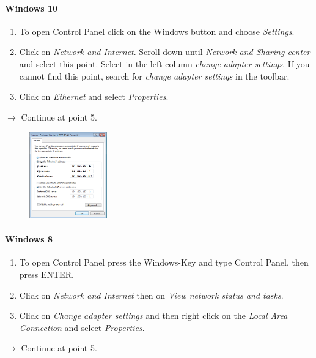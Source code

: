 \documentclass[a4paper,12pt]{scrartcl}
\begin{document}
\paragraph*{Windows 10}
\begin{enumerate}
    \item To open Control Panel click on the Windows button and choose \emph{Settings}.
    \item Click on \emph{Network and Internet}. Scroll down until \emph{Network and Sharing center} and select this point. Select in the left column \textit{change adapter settings}. If you cannot find this point, search for \emph{change adapter settings} in the toolbar.
    \item Click on \emph{Ethernet} and select \emph{Properties}.
\end{enumerate}
$\rightarrow$ Continue at point 5.

\begin{figure}
\centering
  \includegraphics[width=0.3\textwidth]{Bilder/IP_Windows_EN}
\end{figure}

\paragraph*{Windows 8}
\begin{enumerate}	
	\item To open Control Panel press the Windows-Key and type Control Panel, then press ENTER.
    \item Click on \emph{Network and Internet} then on \emph{View network status and tasks}.
	\item Click on \emph{Change adapter settings} and then right click on the \emph{Local Area Connection} and select \emph{Properties}.
\end{enumerate}
$\rightarrow$ Continue at point 5.
\end{document}
